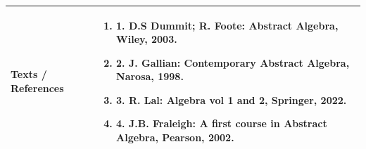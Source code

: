 \documentclass[11pt,a4paper]{article}
\begin{document}
\vspace{8pt}
\renewcommand{\arraystretch}{1.3}
\begin{tabularx}{\textwidth}{|p{3.2cm}|X|}
\hline
\textbf{Texts / References} & \begin{enumerate}[leftmargin=*,noitemsep,topsep=2pt]  \item 1. D.S Dummit; R. Foote: Abstract Algebra, Wiley, 2003.  \item 2. J. Gallian: Contemporary Abstract Algebra, Narosa, 1998.  \item 3. R. Lal: Algebra vol 1 and 2, Springer, 2022.  \item 4. J.B. Fraleigh: A first course in Abstract Algebra, Pearson, 2002.\end{enumerate} \\
\hline
\end{tabularx}
\clearpage
\end{document}
